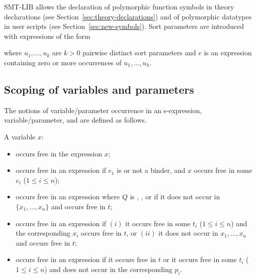 SMT-LIB allows the declaration of polymorphic function symbols 
in theory declarations (see Section~\ref{sec:theory-declarations}) and 
of polymorphic datatypes in user scripts (see Section~\ref{sec:new-symbols}).
Sort parameters are introduced with expressions of the form
\begin{center}
\end{center}
where $u_1, \ldots, u_k$ are $k>0$ pairwise distinct sort parameters and
$e$ is an expression containing zero or more occurrences of $u_1, \ldots, u_k$.

\subsection{Scoping of variables and parameters} \label{sec:free}

The notions of  variable/parameter occurrence in an s-expression,
 variable/parameter, and
 are defined as follows.
\smallskip

\noindent A variable $x$:
\begin{itemize}
\item
occurs free in the expression $x$;
\item
occurs free in an expression 
if $e_1$ is  or not a binder, and 
$x$ occurs free in some $e_i$ ($1\le i\le n$); 
\item
occurs free in an expression 
where $Q$ is , , or 
if it does not occur in $\{x_1, \ldots, x_n\}$ and occurs free in $t$;
\item
occurs free in an expression 
 if 
$(i)$ it occurs free in some $t_i$ ($1\le i\le n$) and 
the corresponding $x_i$ occurs free in $t$, or 
$(ii)$ it does not occur in $x_1, \ldots, x_n$ and occurs free in $t$;
\item
occurs free in an expression
if it occurs free in $t$ or it occurs free in some $t_i$ ($1\le i\le n$) and
does not occur in the corresponding $p_i$.
\end{itemize}

